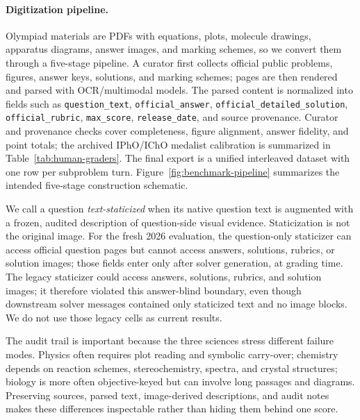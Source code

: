 \documentclass[11pt]{article}
\begin{document}
\paragraph{Digitization pipeline.}
Olympiad materials are PDFs with equations, plots, molecule drawings, apparatus diagrams, answer images, and marking schemes, so we convert them through a five-stage pipeline.
A curator first collects official public problems, figures, answer keys, solutions, and marking schemes; pages are then rendered and parsed with OCR/multimodal models.
The parsed content is normalized into fields such as \texttt{question\_text}, \texttt{official\_answer}, \texttt{official\_detailed\_solution}, \texttt{official\_rubric}, \texttt{max\_score}, \texttt{release\_date}, and source provenance.
Curator and provenance checks cover completeness, figure alignment, answer fidelity, and point totals; the archived IPhO/IChO medalist calibration is summarized in Table~\ref{tab:human-graders}.
The final export is a unified interleaved dataset with one row per subproblem turn.
Figure~\ref{fig:benchmark-pipeline} summarizes the intended five-stage construction schematic.

We call a question \emph{text-staticized} when its native question text is augmented with a frozen, audited description of question-side visual evidence.
Staticization is not the original image.
For the fresh 2026 evaluation, the question-only staticizer can access official question pages but cannot access answers, solutions, rubrics, or solution images; those fields enter only after solver generation, at grading time.
The legacy staticizer could access answers, solutions, rubrics, and solution images; it therefore violated this answer-blind boundary, even though downstream solver messages contained only staticized text and no image blocks. We do not use those legacy cells as current results.

The audit trail is important because the three sciences stress different failure modes.
Physics often requires plot reading and symbolic carry-over; chemistry depends on reaction schemes, stereochemistry, spectra, and crystal structures; biology is more often objective-keyed but can involve long passages and diagrams.
Preserving sources, parsed text, image-derived descriptions, and audit notes makes these differences inspectable rather than hiding them behind one score.
\end{document}
